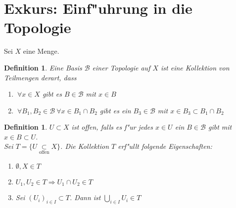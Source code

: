 \documentclass[a4paper,12pt,numbers=noenddot,parskip=full]{scrartcl}
\newcommand{\Forall}{~\forall}
\newcommand{\scrB}{\mathcal{B}}
\theoremstyle{dotless}
\newtheorem{definition}[theorem]{Definition}
\theoremstyle{remark}
\begin{document}
\section[Topologie]{Exkurs: Einf"uhrung in die Topologie}
Sei $X$ eine Menge.
\begin{definition}
	Eine Basis $\scrB$ einer Topologie auf $X$ ist eine Kollektion von Teilmengen derart, dass
	\begin{enumerate}
		\item $\Forall x \in X$ gibt es $B \in \scrB$ mit $x \in B$
		\item $\Forall B_1, B_2 \in \scrB \Forall x \in B_1 \cap B_2$ gibt es ein $B_3 \in \scrB$ mit $x \in B_3 \subset B_1 \cap B_2$
	\end{enumerate}
\end{definition}
\begin{definition}
	$U\subset X$ ist \emph{offen}, falls es f"ur jedes $x \in U$ ein $B \in \scrB$ gibt mit $x \in B \subset U$.\\
	Sei $T = \{ U \underset{\text{offen}}{\subset} X\}$. Die Kollektion $T$ erf"ullt folgende Eigenschaften:
	\begin{enumerate}
		\item $\emptyset, X \in T$
		\item $U_1, U_2 \in T \Rightarrow U_1 \cap U_2 \in T$
		\item Sei $(U_i)_{i \in I} \subset T$. Dann ist $\bigcup\limits_{i \in I} U_i \in T$
	\end{enumerate}
\end{definition}
\end{document}
